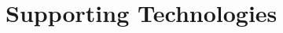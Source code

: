 \documentclass[ %
                    author={Tom Jager},
                supervisor={Dr. Daniel Schien},
                    degree={MEng},
                     title={A Bayesian Inference Engine for Calibrating Uncertainty over UMIS Structured MFA Systems},
                  subtitle={},
                      type={research},
                      year={2019} ]{dissertation}
\begin{document}

\chapter*{Supporting Technologies}
\end{document}
